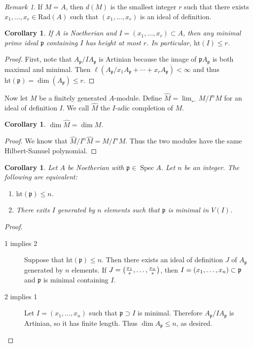 \documentclass[leqno, openany]{memoir}
\newtheorem{cor}[thm]{Corollary}
\theoremstyle{definition}
\theoremstyle{remark}
\newtheorem{rmk}[thm]{Remark}
\theoremstyle{plain}
\theoremstyle{definition}
\theoremstyle{remark}
\newcommand{\mf}[1]{\mathfrak{#1}}
\newcommand{\mr}[1]{\mathrm{#1}}
\newcommand{\wh}[1]{\widehat{#1}}
\DeclareMathOperator{\Spec}{Spec}
\begin{document}
\begin{rmk} If $M = A$, then $d(M)$ is the smallest integer $r$ such that there
exists $x_1, \ldots, x_r \in \mr{Rad}(A)$ such that $(x_1, \ldots, x_r)$ is an
ideal of definition.  \end{rmk}

\begin{cor} If $A$ is Noetherian and $I = (x_1, \ldots, x_r) \subset A$, then
any minimal prime ideal $\mf{p}$ containing $I$ has height at most $r$. In
particular, $\mr{ht}(I) \leq r$.  \end{cor}

\begin{proof} First, note that $A_{\mf{p}} / IA_{\mf{p}}$ is Artinian because
    the image of $\mf{p}A_{\mf{p}}$ is both maximal and minimal. Then
    $\ell(A_{\mf{p}} / x_1 A_{\mf{p}} + \cdots + x_r A_{\mf{p}}) < \infty$ and
    thus $\mr{ht}(\mf{p}) = \dim(A_{\mf{p}}) \leq r$.  \end{proof}

Now let $M$ be a finitely generated $A$-module. Define $\wh{M} = \lim_{\gets} M
/ I^n M$ for an ideal of definition $I$. We call $\wh{M}$ the $I$-adic
completion of $M$.

\begin{cor} $\dim \wh{M} = \dim M$.  \end{cor}

\begin{proof} We know that $\wh{M} / I^n \wh{M} = M / I^nM$. Thus the two
modules have the same Hilbert-Samuel polynomial.  \end{proof}

\begin{cor} Let $A$ be Noetherian with $\mf{p} \in \Spec A$. Let $n$ be an
    integer. The following are equivalent: \begin{enumerate} \item
        $\mr{ht}(\mf{p}) \leq n$.  \item There exits $I$ generated by $n$
        elements such that $\mf{p}$ is minimal in $V(I)$.  \end{enumerate}
    \end{cor}

\begin{proof} \begin{description} \item[1 implies 2] Suppose that
    $\mr{ht}(\mf{p}) \leq n$. Then there exists an ideal of definition $J$ of
    $A_{\mf{p}}$ generated by $n$ elements. If $J = \qty( \frac{x_1}{s},
    \ldots, \frac{x_n}{s} )$, then $I = \qty(x_1, \ldots, x_n) \subset \mf{p}$
    and $\mf{p}$ is minimal containing $I$.  \item[2 implies 1] Let $I = (x_1,
    \ldots, x_n)$ such that $\mf{p} \supset I$ is minimal. Therefore
    $A_{\mf{p}} / IA_{\mf{p}}$ is Artinian, so it has finite length. Thus $\dim
    A_{\mf{p}} \leq n$, as desired. \qedhere \end{description} \end{proof}
\end{document}
